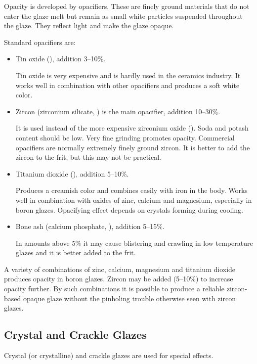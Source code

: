 Opacity is developed by opacifiers. These are finely ground materials that do 
not enter the glaze melt but remain as small white particles suspended 
throughout the glaze. They reflect light and make the glaze opaque. 

Standard opacifiers are:
\begin{itemize}
\item Tin oxide (), addition 3--10\%. 

Tin oxide is very expensive and is hardly used in the ceramics industry. It 
works well in combination with other opacifiers and produces a soft white color.
\item Zircon (zirconium silicate, ) is the main opacifier, addition 
10--30\%. 

It is used instead of the more expensive zirconium oxide (). 
Soda and potash content should be low. Very fine grinding promotes opacity. 
Commercial opacifiers are normally extremely finely ground zircon. It is better 
to add the zircon to the frit, but this may not be practical.
\item Titanium dioxide (), addition 5--10\%. 

Produces a creamish color 
and combines easily with iron in the body. Works well in combination with 
oxides of zinc, calcium and magnesium, especially in boron glazes. Opacifying 
effect depends on crystals forming during cooling.
\item Bone ash (calcium phosphate, ), addition 5--15\%. 

In 
amounts above 5\% it may cause blistering and crawling in low temperature 
glazes and it is better added to the frit.
\end{itemize}
A variety of combinations of zinc, calcium, magnesium and titanium dioxide 
produces opacity in boron glazes. Zircon may be added (5--10\%) to increase 
opacity further. By such combinations it is possible to produce a reliable 
zircon-based opaque glaze without the pinholing trouble otherwise seen with 
zircon glazes.
\subsection{Crystal and Crackle Glazes}
Crystal (or crystalline) and crackle glazes are used for special effects.

